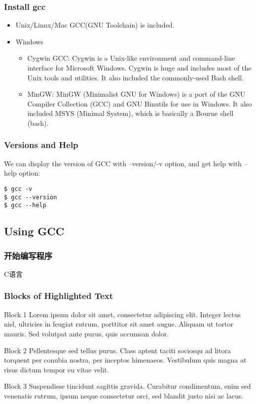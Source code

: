 \documentclass{beamer}
\begin{document}
\begin{frame}
\frametitle{Install gcc}
\begin{itemize}
\item Unix/Linux/Mac GCC(GNU Toolchain) is included.
\item Windows
\begin{itemize}
\item Cygwin GCC: Cygwin is a Unix-like environment and command-line interface for Microsoft Windows. Cygwin is huge and includes most of the Unix tools and utilities. It also included the commonly-used Bash shell.
\item MinGW: MinGW (Minimalist GNU for Windows) is a port of the GNU Compiler Collection (GCC) and GNU Binutils for use in Windows. It also included MSYS (Minimal System), which is basically a Bourne shell (bash).
\end{itemize}
\end{itemize}
\end{frame}

\begin{frame}[fragile]
\frametitle{Versions and Help}
We can display the version of GCC with --version/-v option, and get help with --help option:
\begin{example}
\begin{verbatim}
$ gcc -v
$ gcc --version
$ gcc --help
\end{verbatim}
\end{example}
\end{frame}

\subsection{Using GCC}
\begin{frame}
\frametitle{开始编写程序}
C语言
\end{frame}
\begin{frame}
\frametitle{Blocks of Highlighted Text}
\begin{block}{Block 1}
Lorem ipsum dolor sit amet, consectetur adipiscing elit. Integer lectus nisl, ultricies in feugiat rutrum, porttitor sit amet augue. Aliquam ut tortor mauris. Sed volutpat ante purus, quis accumsan dolor.
\end{block}

\begin{block}{Block 2}
Pellentesque sed tellus purus. Class aptent taciti sociosqu ad litora torquent per conubia nostra, per inceptos himenaeos. Vestibulum quis magna at risus dictum tempor eu vitae velit.
\end{block}

\begin{block}{Block 3}
Suspendisse tincidunt sagittis gravida. Curabitur condimentum, enim sed venenatis rutrum, ipsum neque consectetur orci, sed blandit justo nisi ac lacus.
\end{block}
\end{frame}
\end{document}
